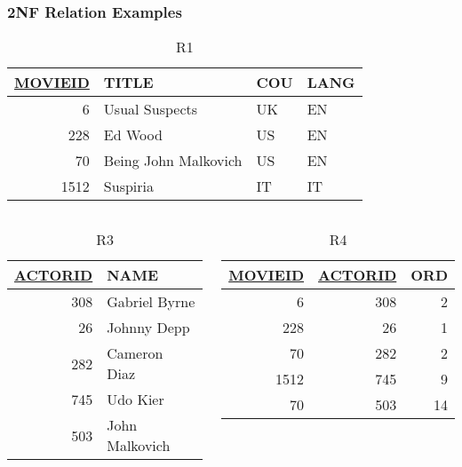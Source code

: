 \documentclass[dvipsnames]{beamer}
\begin{document}
\begin{frame}
  \frametitle{2NF Relation Examples}

  \begin{example}
    \begin{center}
      \begin{tiny}
      \begin{table}
        \caption{R1}
        \begin{tabular}{|r|l|l|l|}\hline
\underline{MOVIEID} & TITLE    & COU & LANG\\\hline\hline
      6 & Usual Suspects       & UK  & EN  \\\hline
    228 & Ed Wood              & US  & EN  \\\hline
     70 & Being John Malkovich & US  & EN  \\\hline
   1512 & Suspiria             & IT  & IT  \\\hline
        \end{tabular}
      \end{table}
      \end{tiny}
    \end{center}

    \vspace{-0.7cm}
    \begin{columns}[t]
      \begin{tiny}
      \begin{table}
        \caption{R3}
        \begin{tabular}{|r|l|}\hline
\underline{ACTORID} & NAME\\\hline\hline
      308 & Gabriel Byrne \\\hline
       26 & Johnny Depp   \\\hline
      282 & Cameron Diaz  \\\hline
      745 & Udo Kier      \\\hline
      503 & John Malkovich\\\hline
        \end{tabular}
      \end{table}
      \end{tiny}

      \begin{tiny}
      \begin{table}
        \caption{R4}
        \begin{tabular}{|r|r|r|}\hline
\underline{MOVIEID} & \underline{ACTORID} & ORD\\\hline\hline
   6 & 308 &  2\\\hline
 228 &  26 &  1\\\hline
  70 & 282 &  2\\\hline
1512 & 745 &  9\\\hline
  70 & 503 & 14\\\hline
        \end{tabular}
      \end{table}
      \end{tiny}
    \end{columns}
  \end{example}
\end{frame}
\end{document}
